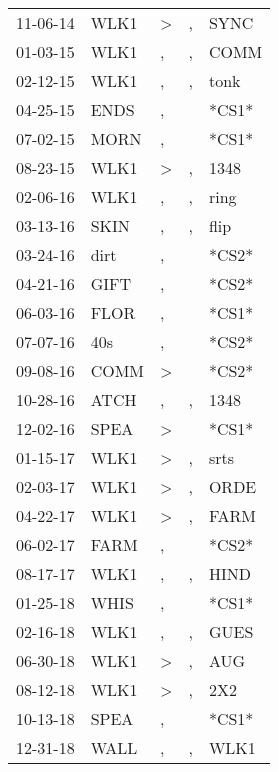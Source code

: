 \begin{supertabular}{lllll}
 11-06-14 &   WLK1 &  \textgreater &             , &   SYNC \\
 01-03-15 &   WLK1 &             , &             , &   COMM \\
 02-12-15 &   WLK1 &             , &             , &   tonk \\
 04-25-15 &   ENDS &             , &               &  *CS1* \\
 07-02-15 &   MORN &             , &               &  *CS1* \\
 08-23-15 &   WLK1 &  \textgreater &             , &   1348 \\
 02-06-16 &   WLK1 &             , &             , &   ring \\
 03-13-16 &   SKIN &             , &             , &   flip \\
 03-24-16 &   dirt &             , &               &  *CS2* \\
 04-21-16 &   GIFT &             , &               &  *CS2* \\
 06-03-16 &   FLOR &             , &               &  *CS1* \\
 07-07-16 &    40s &             , &               &  *CS2* \\
 09-08-16 &   COMM &  \textgreater &               &  *CS2* \\
 10-28-16 &   ATCH &             , &             , &   1348 \\
 12-02-16 &   SPEA &  \textgreater &               &  *CS1* \\
 01-15-17 &   WLK1 &  \textgreater &             , &   srts \\
 02-03-17 &   WLK1 &  \textgreater &             , &   ORDE \\
 04-22-17 &   WLK1 &  \textgreater &             , &   FARM \\
 06-02-17 &   FARM &             , &               &  *CS2* \\
 08-17-17 &   WLK1 &             , &             , &   HIND \\
 01-25-18 &   WHIS &             , &               &  *CS1* \\
 02-16-18 &   WLK1 &             , &             , &   GUES \\
 06-30-18 &   WLK1 &  \textgreater &             , &    AUG \\
 08-12-18 &   WLK1 &  \textgreater &             , &    2X2 \\
 10-13-18 &   SPEA &             , &               &  *CS1* \\
 12-31-18 &   WALL &             , &             , &   WLK1 \\

\end{supertabular}
